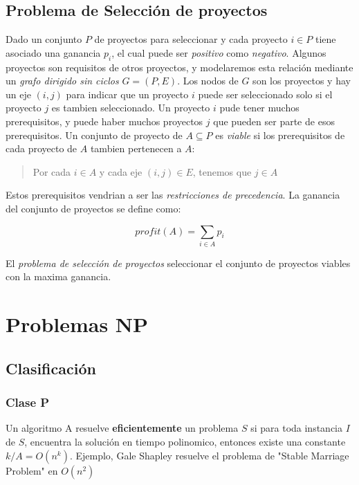 \documentclass{article}
\begin{document}
\newpage
\subsection{Problema de Selección de proyectos}

Dado un conjunto \(P\) de proyectos para seleccionar y cada proyecto \(i \in P\) tiene
asociado una ganancia \(p_i\), el cual puede ser \textit{positivo} como \textit{negativo}.
Algunos proyectos son requisitos de otros proyectos, y modelaremos esta relación mediante un \textit{grafo
dirigido sin ciclos} \(G=(P,E)\). Los nodos de \(G\) son los proyectos y hay un eje \((i,j)\) para indicar
que un proyecto \(i\) puede ser seleccionado solo si el proyecto \(j\) es tambien seleccionado.
Un proyecto \(i\) pude tener muchos prerequisitos, y puede haber muchos proyectos \(j\) que pueden
ser parte de esos prerequisitos. Un conjunto de proyecto de \(A \subseteq P\) es \textit{viable} si los 
prerequisitos de cada proyecto de \(A\) tambien pertenecen a \(A\):
\begin{quote}
    Por cada \(i \in A\) y cada eje \((i,j) \in E\), tenemos que \(j \in A\)
\end{quote}
Estos prerequisitos vendrian a ser las \textit{restricciones de precedencia}. La ganancia del conjunto de proyectos
se define como:

\[
    profit(A) = \sum_{i\in A} p_i 
\]

El \textit{problema de selección de proyectos} seleccionar el conjunto de proyectos viables con la maxima ganancia.


\newpage
\section{Problemas NP}

\subsection{Clasificación}

\subsubsection{Clase P}

Un algoritmo A resuelve \textbf{eficientemente} un problema \(S\) si para toda instancia \(I\) de \(S\),
encuentra la solución en tiempo polinomico, entonces existe una constante \(k / A = O(n^k)\). 
Ejemplo, Gale Shapley resuelve el problema de "Stable Marriage Problem" en \(O(n^2)\)
\end{document}
